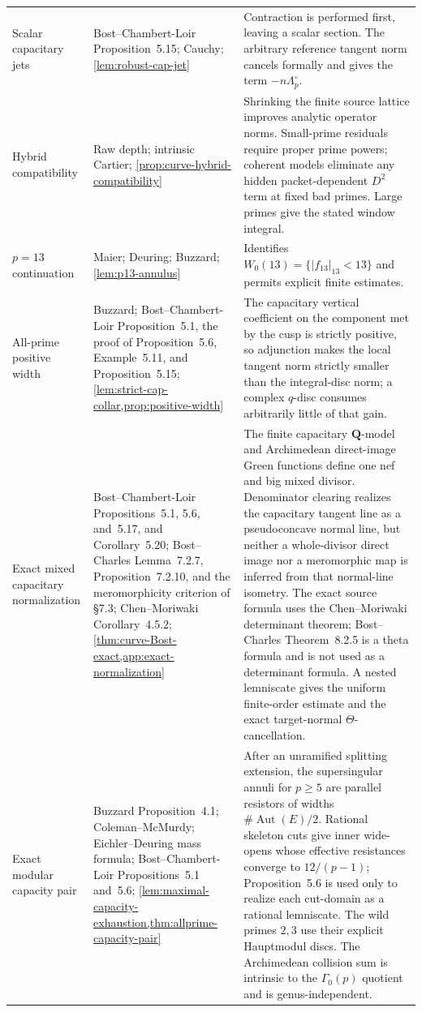 \documentclass[11pt]{article}
\theoremstyle{definition}
\theoremstyle{remark}
\newcommand{\Q}{\mathbf Q}
\begin{document}
\begin{longtable}{@{}>{\raggedright\arraybackslash}p{}>{\raggedright\arraybackslash}p{}>{\raggedright\arraybackslash}p{}@{}}
Scalar capacitary jets&Bost--Chambert-Loir Proposition~5.15; Cauchy; \cref{lem:robust-cap-jet}&Contraction is performed first, leaving a scalar section.  The arbitrary reference tangent norm cancels formally and gives the term $-n\Lambda_p^\circ$.\\
Hybrid compatibility&Raw depth; intrinsic Cartier; \cref{prop:curve-hybrid-compatibility}&Shrinking the finite source lattice improves analytic operator norms.  Small-prime residuals require proper prime powers; coherent models eliminate any hidden packet-dependent $D^2$ term at fixed bad primes.  Large primes give the stated window integral.\\
$p=13$ continuation&Maier; Deuring; Buzzard; \cref{lem:p13-annulus}&Identifies $W_0(13)=\{|f_{13}|_{13}<13\}$ and permits explicit finite estimates.\\
All-prime positive width&Buzzard; Bost--Chambert-Loir Proposition~5.1, the proof of Proposition~5.6, Example~5.11, and Proposition~5.15; \cref{lem:strict-cap-collar,prop:positive-width}&The capacitary vertical coefficient on the component met by the cusp is strictly positive, so adjunction makes the local tangent norm strictly smaller than the integral-disc norm; a complex $q$-disc consumes arbitrarily little of that gain.\\
Exact mixed capacitary normalization&Bost--Chambert-Loir Propositions~5.1, 5.6, and~5.17, and Corollary~5.20; Bost--Charles Lemma~7.2.7, Proposition~7.2.10, and the meromorphicity criterion of \S7.3; Chen--Moriwaki Corollary~4.5.2; \cref{thm:curve-Bost-exact,app:exact-normalization}&The finite capacitary $\Q$-model and Archimedean direct-image Green functions define one nef and big mixed divisor.  Denominator clearing realizes the capacitary tangent line as a pseudoconcave normal line, but neither a whole-divisor direct image nor a meromorphic map is inferred from that normal-line isometry.  The exact source formula uses the Chen--Moriwaki determinant theorem; Bost--Charles Theorem~8.2.5 is a theta formula and is not used as a determinant formula.  A nested lemniscate gives the uniform finite-order estimate and the exact target-normal $\Theta$-cancellation.\\
Exact modular capacity pair&Buzzard Proposition~4.1; Coleman--McMurdy; Eichler--Deuring mass formula; Bost--Chambert-Loir Propositions~5.1 and~5.6; \cref{lem:maximal-capacity-exhaustion,thm:allprime-capacity-pair}&After an unramified splitting extension, the supersingular annuli for $p\ge5$ are parallel resistors of widths $\#\operatorname{Aut}(E)/2$.  Rational skeleton cuts give inner wide-opens whose effective resistances converge to $12/(p-1)$; Proposition~5.6 is used only to realize each cut-domain as a rational lemniscate.  The wild primes $2,3$ use their explicit Hauptmodul discs.  The Archimedean collision sum is intrinsic to the $\Gamma_0(p)$ quotient and is genus-independent.\\

\end{longtable}
\end{document}
